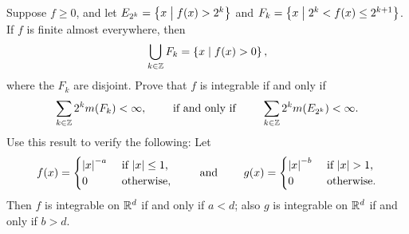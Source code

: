 \begin{exercise}
    Suppose $f\geq 0$, and let $E_{2^k} = \left\{ x \;\middle\vert\; f(x)>2^k \right\}$ and 
    $F_k = \left\{ x \;\middle\vert\; 2^k<f(x)\leq 2^{k+1} \right\}$. If $f$ is finite almost everywhere, then 
    \begin{equation*}
        \bigcup_{k\in\mathbb{Z}} F_k = \left\{ x \;\middle\vert\; f(x)>0 \right\},
    \end{equation*}
    where the $F_k$ are disjoint. Prove that $f$ is integrable if and only if 
    \begin{equation*}
        \sum_{k\in\mathbb{Z}} 2^k m(F_k) < \infty,\qquad\text{ if and only if }\qquad
        \sum_{k\in\mathbb{Z}} 2^k m(E_{2^k}) < \infty.
    \end{equation*}
    Use this result to verify the following: Let 
    \begin{equation*}
        f(x) = \begin{cases}
            \left\lvert {x} \right\rvert^{-a} & \text{ if $\left\lvert {x} \right\rvert\leq 1$,} \\
            0 & \text{ otherwise,} 
        \end{cases}\qquad\text{ and }\qquad
        g(x) = \begin{cases}
            \left\lvert {x} \right\rvert^{-b} & \text{ if $\left\lvert {x} \right\rvert>1$,} \\
            0 & \text{ otherwise.}
        \end{cases}
    \end{equation*}
    Then $f$ is integrable on $\mathbb{R}^d$ if and only if $a<d$; also $g$ is integrable on 
    $\mathbb{R}^d$ if and only if $b>d$.
\end{exercise}
